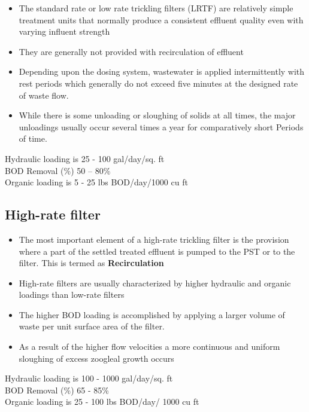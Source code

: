 \begin{itemize}
\item The standard rate or low rate trickling filters (LRTF) are relatively simple treatment units that normally produce a consistent effluent quality even with varying influent strength
\item They are generally not provided with recirculation of effluent
\item Depending upon the dosing system, wastewater is applied intermittently with rest periods which generally do not exceed five minutes at the designed rate of waste flow. 
\item While there is some unloading or sloughing of solids at all times, the major unloadings usually occur several times a year for comparatively short Periods of time.
\end{itemize}

     Hydraulic loading is 25 - 100 gal/day/sq. ft\\
     BOD Removal (\%) 	50 – 80\%\\
     Organic loading is 5 - 25 lbs BOD/day/1000 cu ft\\

\subsection{High-rate filter}

\begin{itemize}
\item The most important element of a high-rate trickling filter is the provision where a part of the settled treated effluent is pumped to the PST or to the filter.  This is termed as \textbf{Recirculation}
\item High-rate filters are usually characterized by higher hydraulic and organic loadings than low-rate filters
\item The higher BOD loading is accomplished by applying a larger volume of waste per unit surface area of the filter.  \item As a result of the higher flow velocities a more continuous and uniform sloughing of excess zoogleal growth occurs
\end{itemize}

     Hydraulic loading is 100 - 1000 gal/day/sq. ft\\
     BOD Removal (\%) 	65 - 85\%\\
     Organic loading is 25 - 100 lbs BOD/day/ 1000 cu ft\\
			
